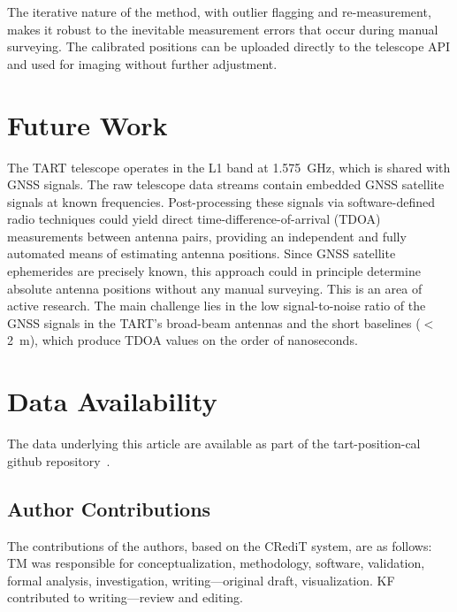 \documentclass[twocolumn, a4paper,10pt]{article}
\begin{document}
The iterative nature of the method, with outlier flagging and re-measurement, makes it robust to the inevitable measurement errors that occur during manual surveying. The calibrated positions can be uploaded directly to the telescope API and used for imaging without further adjustment.

\section{Future Work}

The TART telescope operates in the L1 band at 1.575~GHz, which is shared with GNSS signals. The raw telescope data streams contain embedded GNSS satellite signals at known frequencies. Post-processing these signals via software-defined radio techniques could yield direct time-difference-of-arrival (TDOA) measurements between antenna pairs, providing an independent and fully automated means of estimating antenna positions. Since GNSS satellite ephemerides are precisely known, this approach could in principle determine absolute antenna positions without any manual surveying. This is an area of active research. The main challenge lies in the low signal-to-noise ratio of the GNSS signals in the TART's broad-beam antennas and the short baselines ($<$\,2~m), which produce TDOA values on the order of nanoseconds.

\section*{Data Availability}

The data underlying this article are available as part of the tart-position-cal github repository~\cite{moltento2026tartpositioncal}.

\subsection*{Author Contributions}

The contributions of the authors, based on the CRediT system, are as follows: TM was responsible for conceptualization, methodology, software, validation, formal analysis, investigation, writing—original draft, visualization. KF contributed to writing—review and editing.



\end{document}
